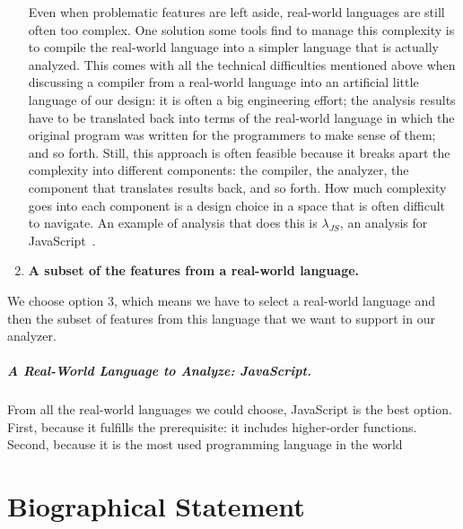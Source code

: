\documentclass[12pt, oneside]{book}
\begin{document}
\begin{enumerate}
Even when problematic features are left aside, real-world languages are still often too complex. One solution some tools find to manage this complexity is to compile the real-world language into a simpler language that is actually analyzed. This comes with all the technical difficulties mentioned above when discussing a compiler from a real-world language into an artificial little language of our design: it is often a big engineering effort; the analysis results have to be translated back into terms of the real-world language in which the original program was written for the programmers to make sense of them; and so forth. Still, this approach is often feasible because it breaks apart the complexity into different components: the compiler, the analyzer, the component that translates results back, and so forth. How much complexity goes into each component is a design choice in a space that is often difficult to navigate. An example of analysis that does this is \(\lambda_{\mathit{JS}}\), an analysis for JavaScript~\cite{lambda-js}.

\item \textbf{A subset of the features from a real-world language.}
\end{enumerate}

We choose option 3, which means we have to select a real-world language and then the subset of features from this language that we want to support in our analyzer.

\paragraph{A Real-World Language to Analyze: JavaScript.}

From all the real-world languages we could choose, JavaScript is the best option. First, because it fulfills the prerequisite: it includes higher-order functions. Second, because it is the most used programming language in the world~\cite{stack-overflow-developer-survey, jet-brains-developer-survey}

\appendix


\backmatter




\chapter{Biographical Statement}

\end{document}
